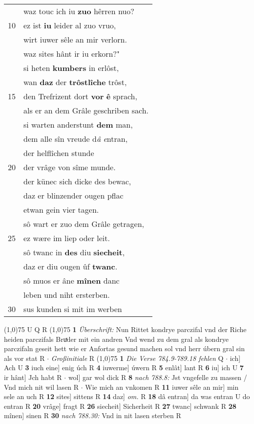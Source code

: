 \documentclass[8pt,a4paper,notitlepage]{article}
\begin{document}
\begin{table}[ht]
\begin{minipage}[t]{0.5\linewidth}
\begin{tabular}{rl}
 & waz touc ich iu \textbf{zuo} hêrren nuo?\\ 
10 & ez ist \textbf{iu} leider al zuo vruo,\\ 
 & wirt iuwer sêle an mir verlorn.\\ 
 & waz sites hânt ir iu erkorn?"\\ 
 & si heten \textbf{kumbers} in erlôst,\\ 
 & wan \textbf{daz} der \textbf{trôstlîche} trôst,\\ 
15 & den Trefrizent dort \textbf{vor} \textbf{ê} sprach,\\ 
 & als er an dem Grâle geschriben sach.\\ 
 & si warten anderstunt \textbf{dem} man,\\ 
 & dem alle sîn vreude d\textit{â} \textit{e}ntran,\\ 
 & der helflîchen stunde\\ 
20 & der vrâge von sîme munde.\\ 
 & der künec sich dicke des bewac,\\ 
 & daz er blinzender ougen pflac\\ 
 & etwan gein vier tagen.\\ 
 & sô wart er zuo dem Grâle getragen,\\ 
25 & ez wære im liep oder leit.\\ 
 & sô twanc in \textbf{des} diu \textbf{siecheit},\\ 
 & daz er diu ougen ûf \textbf{twanc}.\\ 
 & sô muos er âne \textbf{mînen} danc\\ 
 & leben und niht ersterben.\\ 
30 & sus kunden si mit im werben\\ 
\end{tabular}
\scriptsize
\line(1,0){75} \newline
U Q R \newline
\line(1,0){75} \newline
\textbf{1} \textit{Überschrift:} Nun Rittet kondrye parczifal vnd der Riche heiden parczifals Bruͯder mit ein andren Vnd wend zu dem gral als kondrye parczifaln geseit hett wie er Anfortas gesund machen sol vnd herr úbern gral sin als vor stat R   $\cdot$ \textit{Großinitiale} R  \newline
\line(1,0){75} \newline
\textbf{1} \textit{Die Verse 784.9-789.18 fehlen} Q   $\cdot$ ich] Ach U \textbf{3} iuch eine] enig úch R \textbf{4} iuwerme] úwern R \textbf{5} enlât] lant R \textbf{6} iu] ich U \textbf{7} ir hânt] Jch habt R  $\cdot$ wol] gar wol dick R \textbf{8} \textit{nach 788.8:} Jst vngefelle zu massen / Vnd mich nit wil lasen R   $\cdot$ Wie mich an vnkomen R \textbf{11} iuwer sêle an mir] min sele an uch R \textbf{12} sites] sittens R \textbf{14} daz] \textit{om.} R \textbf{18} dâ entran] da was entran U do entran R \textbf{20} vrâge] fragt R \textbf{26} siecheit] Sicherheit R \textbf{27} twanc] schwank R \textbf{28} mînen] sinen R \textbf{30} \textit{nach 788.30:} Vnd in nit lasen sterben R  \newline
\end{minipage}
\end{table}
\end{document}
